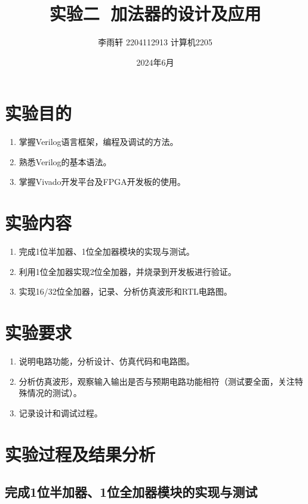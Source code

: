 \documentclass[a4,10pt,zihao=-4]{ctexart}
\begin{document}
\title{实验二\,\,\,\,加法器的设计及应用}

\author{李雨轩 2204112913 计算机2205}
\date{2024年6月}
\maketitle

\section{实验目的}
\begin{enumerate}
  \item 掌握Verilog语言框架，编程及调试的方法。
  \item 熟悉Verilog的基本语法。
  \item 掌握Vivado开发平台及FPGA开发板的使用。
\end{enumerate}

\section{实验内容}
\begin{enumerate}
  \item 完成1位半加器、1位全加器模块的实现与测试。
  \item 利用1位全加器实现2位全加器，并烧录到开发板进行验证。
  \item 实现16/32位全加器，记录、分析仿真波形和RTL电路图。
\end{enumerate}

\section{实验要求}
\begin{enumerate}
  \item 说明电路功能，分析设计、仿真代码和电路图。
  \item 分析仿真波形，观察输入输出是否与预期电路功能相符（测试要全面，关注特殊情况的测试）。
  \item 记录设计和调试过程。
\end{enumerate}

\section{实验过程及结果分析}
\subsection{完成1位半加器、1位全加器模块的实现与测试}
\end{document}
